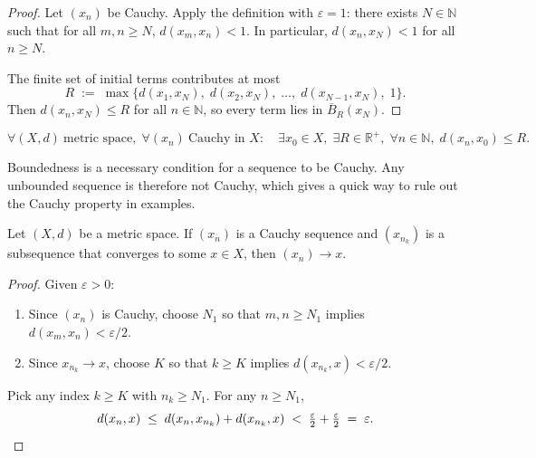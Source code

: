 \begin{proof}
Let $(x_n)$ be Cauchy.
Apply the definition with $\varepsilon = 1$: there exists $N \in \mathbb{N}$
such that for all $m,n \ge N$, $d(x_m,x_n) < 1$.
In particular, $d(x_n, x_N) < 1$ for all $n \ge N$.

The finite set of initial terms contributes at most
\[
  R
  \;:=\;
  \max\bigl\{
    d(x_1, x_N),\;
    d(x_2, x_N),\;
    \ldots,\;
    d(x_{N-1}, x_N),\;
    1
  \bigr\}.
\]
Then $d(x_n, x_N) \le R$ for all $n \in \mathbb{N}$, so every
term lies in $\overline{B}_R(x_N)$.
\end{proof}

\begin{remark*}
\[
\forall (X,d)\ \text{metric space},\;
\forall (x_n)\ \text{Cauchy in } X:\quad
\exists x_0 \in X,\;
\exists R \in \mathbb{R}^{+},\;
\forall n \in \mathbb{N},\;
d(x_n, x_0) \le R.
\]
\end{remark*}

\begin{remark*}[Consequence]
Boundedness is a necessary condition for a sequence to be Cauchy.
Any unbounded sequence is therefore not Cauchy, which gives a quick
way to rule out the Cauchy property in examples.
\end{remark*}

\begin{proposition}
\label{prop:cauchy-subsequence}
Let $(X,d)$ be a metric space.
If $(x_n)$ is a Cauchy sequence and $(x_{n_k})$ is a subsequence that
converges to some $x \in X$, then $(x_n) \to x$.
\end{proposition}

\begin{proof}
Given $\varepsilon > 0$:
\begin{enumerate}[label=(\roman*), leftmargin=2em]
  \item Since $(x_n)$ is Cauchy, choose $N_1$ so that
        $m,n \ge N_1$ implies $d(x_m,x_n) < \varepsilon/2$.
  \item Since $x_{n_k} \to x$, choose $K$ so that $k \ge K$ implies
        $d(x_{n_k}, x) < \varepsilon/2$.
\end{enumerate}
Pick any index $k \ge K$ with $n_k \ge N_1$.
For any $n \ge N_1$,
\[
  d(x_n, x)
  \;\le\;
  d(x_n, x_{n_k}) + d(x_{n_k}, x)
  \;<\;
  \tfrac{\varepsilon}{2} + \tfrac{\varepsilon}{2}
  \;=\;
  \varepsilon. \qedhere
\]
\end{proof}

